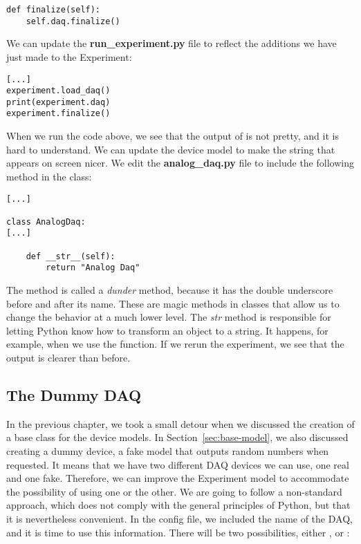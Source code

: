 \begin{verbatim}
def finalize(self):
    self.daq.finalize()
\end{verbatim}

We can update the \textbf{run\_experiment.py} file to reflect the additions we have just made to the Experiment:

\begin{verbatim}
[...]
experiment.load_daq()
print(experiment.daq)
experiment.finalize()
\end{verbatim}

When we run the code above, we see that the output of  is not pretty, and it is hard to understand. We can update the device model to make the string that appears on screen nicer. We edit the \textbf{analog\_daq.py} file to include the following method in the  class:

\begin{verbatim}
[...]

class AnalogDaq:
[...]

    def __str__(self):
        return "Analog Daq"
\end{verbatim}

The method  is called a \emph{dunder} method, because it has the double underscore before and after its name. These are magic methods in classes that allow us to change the behavior at a much lower level. The \emph{str} method is responsible for letting Python know how to transform an object to a string. It happens, for example, when we use the  function. If we rerun the experiment, we see that the output is clearer than before.


\subsection{The Dummy DAQ}\label{subsec:loading-dummy-daq}
In the previous chapter, we took a small detour when we discussed the creation of a base class for the device models. In Section~\ref{sec:base-model}, we also discussed creating a dummy device, a fake model that outputs random numbers when requested. It means that we have two different DAQ devices we can use, one real and one fake. Therefore, we can improve the Experiment model to accommodate the possibility of using one or the other. We are going to follow a non-standard approach, which does not comply with the general principles of Python, but that it is nevertheless convenient. In the config file, we included the name of the DAQ, and it is time to use this information. There will be two possibilities, either , or :

